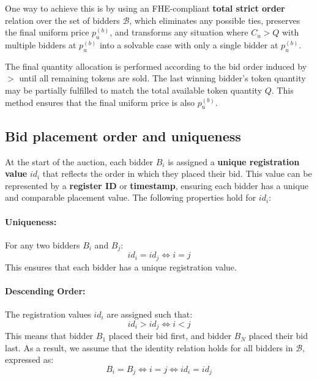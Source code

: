 One way to achieve this is by using an FHE-compliant \textbf{total strict order} relation over the set of bidders $\mathcal{B}$, which eliminates any possible ties, preserves the final uniform price $p_u^{(b)}$, and transforms any situation where $C_u > Q$ with multiple bidders at $p_u^{(b)}$ into a solvable case with only a single bidder at $p_u^{(b)}$.

The final quantity allocation is performed according to the bid order induced by $>$ until all remaining tokens are sold. The last winning bidder's token quantity may be partially fulfilled to match the total available token quantity $Q$. This method ensures that the final uniform price is also $p_u^{(b)}$.


\subsection{Bid placement order and uniqueness}
At the start of the auction, each bidder $B_i$ is assigned a \textbf{unique registration value} $id_i$ that reflects the order in which they placed their bid. This value can be represented by a \textbf{register ID} or \textbf{timestamp}, ensuring each bidder has a unique and comparable placement value. The following properties hold for $id_i$:

\paragraph{Uniqueness:} For any two bidders $B_i$ and $B_j$:
\begin{equation*}
    id_i = id_j \iff i = j
\end{equation*}
This ensures that each bidder has a unique registration value.

\paragraph{Descending Order:}
The registration values $id_i$ are assigned such that:  
\begin{equation*}
    id_i > id_j \iff i < j
\end{equation*}  
This means that bidder $B_1$ placed their bid first, and bidder $B_N$ placed their bid last.
As a result, we assume that the identity relation holds for all bidders in $\mathcal{B}$, expressed as:
\begin{equation*}
    B_i = B_j \iff i = j \iff id_i = id_j
\end{equation*}

